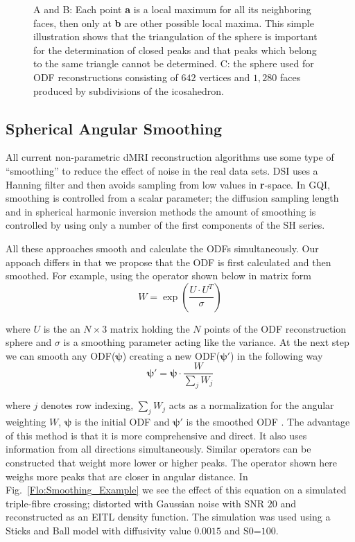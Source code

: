 \documentclass{bioinfo}
\begin{document}
\begin{methods}
\begin{figure}
\centering{}\caption{A and B: Each point \textbf{a} is a local maximum for all its neighboring
faces, then only at \textbf{b} are other possible local maxima. This
simple illustration shows that the triangulation of the sphere is
important for the determination of closed peaks and that peaks which
belong to the same triangle cannot be determined. C: the sphere used
for ODF reconstructions consisting of $642$ vertices and $1,280$
faces produced by subdivisions of the icosahedron.}
\label{Flo:sphere_642}
\end{figure}

\subsection{Spherical Angular Smoothing\label{sub:Spherical-Angular-Smoothing}}

All current non-parametric dMRI reconstruction algorithms use some
type of {}``smoothing'' to reduce the effect of noise in the real
data sets. DSI uses a Hanning filter and then avoids sampling from
low values in \textbf{r}-space. In GQI, smoothing is controlled from
a scalar parameter; the diffusion sampling length and in spherical
harmonic inversion methods \citep{Descoteaux2007MagResMed, aganj2010reconstruction}
the amount of smoothing is controlled by using only a number of the
first components of the SH series. 

All these approaches smooth and calculate the ODFs simultaneously.
Our appoach differs in that we propose that the ODF is first calculated
and then smoothed. For example, using the operator shown below in
matrix form\[
W=\exp(\frac{U\cdot U^{T}}{\sigma})\]


\noindent where $U$ is the an $N\times3$ matrix holding the $N$
points of the ODF reconstruction sphere and $\sigma$ is a smoothing
parameter acting like the variance. At the next step we can smooth
any ODF($\bm{\psi}$) creating a new ODF($\bm{\psi}'$) in the following
way\begin{equation}
\bm{\psi}'=\bm{\psi}\cdot\frac{W}{\sum_{j}W_{j}}\label{eq:spherical_gaussian_angular_smoothing}\end{equation}


\noindent where $j$ denotes row indexing, $\sum_{j}W_{j}$ acts as
a normalization for the angular weighting $W$, $\bm{\psi}$ is the
initial ODF and $\bm{\psi}'$ is the smoothed ODF . The advantage
of this method is that it is more comprehensive and direct. It also
uses information from all directions simultaneously. Similar operators
can be constructed that weight more lower or higher peaks. The operator
shown here weighs more peaks that are closer in angular distance.
In Fig.~\ref{Flo:Smoothing_Example} we see the effect of this equation
on a simulated triple-fibre crossing; distorted with Gaussian noise
with SNR $20$ and reconstructed as an EITL density function. The
simulation was used using a Sticks and Ball model with diffusivity
value $0.0015$ and S0=$100$.


\end{methods}
\end{document}

